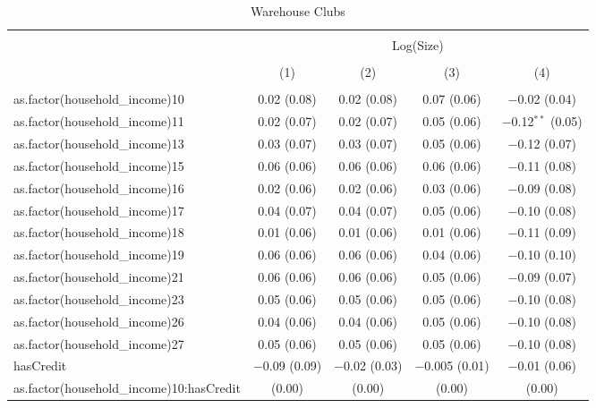 
\begin{table}[!htbp] \centering 
  \caption{Warehouse Clubs} 
  \label{tab:packageSizeWarehouseTamponLiqAppendix} 
\begin{tabular}{@{\extracolsep{5pt}}lcccc} 
\\[-1.8ex]\hline 
\hline \\[-1.8ex] 
 & \multicolumn{4}{c}{Log(Size)} \\ 
\\[-1.8ex] & (1) & (2) & (3) & (4)\\ 
\hline \\[-1.8ex] 
 as.factor(household\_income)10 & 0.02 (0.08) & 0.02 (0.08) & 0.07 (0.06) & $-$0.02 (0.04) \\ 
  as.factor(household\_income)11 & 0.02 (0.07) & 0.02 (0.07) & 0.05 (0.06) & $-$0.12$^{**}$ (0.05) \\ 
  as.factor(household\_income)13 & 0.03 (0.07) & 0.03 (0.07) & 0.05 (0.06) & $-$0.12 (0.07) \\ 
  as.factor(household\_income)15 & 0.06 (0.06) & 0.06 (0.06) & 0.06 (0.06) & $-$0.11 (0.08) \\ 
  as.factor(household\_income)16 & 0.02 (0.06) & 0.02 (0.06) & 0.03 (0.06) & $-$0.09 (0.08) \\ 
  as.factor(household\_income)17 & 0.04 (0.07) & 0.04 (0.07) & 0.05 (0.06) & $-$0.10 (0.08) \\ 
  as.factor(household\_income)18 & 0.01 (0.06) & 0.01 (0.06) & 0.01 (0.06) & $-$0.11 (0.09) \\ 
  as.factor(household\_income)19 & 0.06 (0.06) & 0.06 (0.06) & 0.04 (0.06) & $-$0.10 (0.10) \\ 
  as.factor(household\_income)21 & 0.06 (0.06) & 0.06 (0.06) & 0.05 (0.06) & $-$0.09 (0.07) \\ 
  as.factor(household\_income)23 & 0.05 (0.06) & 0.05 (0.06) & 0.05 (0.06) & $-$0.10 (0.08) \\ 
  as.factor(household\_income)26 & 0.04 (0.06) & 0.04 (0.06) & 0.05 (0.06) & $-$0.10 (0.08) \\ 
  as.factor(household\_income)27 & 0.05 (0.06) & 0.05 (0.06) & 0.05 (0.06) & $-$0.10 (0.08) \\ 
  hasCredit & $-$0.09 (0.09) & $-$0.02 (0.03) & $-$0.005 (0.01) & $-$0.01 (0.06) \\ 
  as.factor(household\_income)10:hasCredit &  (0.00) &  (0.00) &  (0.00) &  (0.00) \\ 

\end{tabular}
\end{table}
